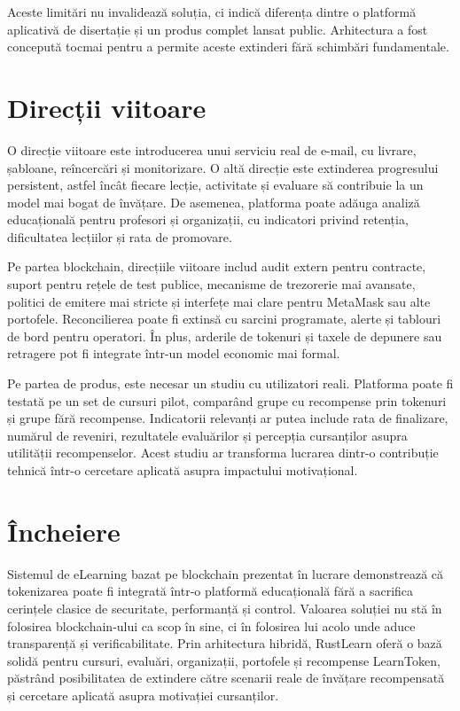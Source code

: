 Aceste limitări nu invalidează soluția, ci indică diferența dintre o platformă aplicativă de disertație și un produs complet lansat public. Arhitectura a fost concepută tocmai pentru a permite aceste extinderi fără schimbări fundamentale.

\section{Direcții viitoare}
O direcție viitoare este introducerea unui serviciu real de e-mail, cu livrare, șabloane, reîncercări și monitorizare. O altă direcție este extinderea progresului persistent, astfel încât fiecare lecție, activitate și evaluare să contribuie la un model mai bogat de învățare. De asemenea, platforma poate adăuga analiză educațională pentru profesori și organizații, cu indicatori privind retenția, dificultatea lecțiilor și rata de promovare.

Pe partea blockchain, direcțiile viitoare includ audit extern pentru contracte, suport pentru rețele de test publice, mecanisme de trezorerie mai avansate, politici de emitere mai stricte și interfețe mai clare pentru MetaMask sau alte portofele. Reconcilierea poate fi extinsă cu sarcini programate, alerte și tablouri de bord pentru operatori. În plus, arderile de tokenuri și taxele de depunere sau retragere pot fi integrate într-un model economic mai formal.

Pe partea de produs, este necesar un studiu cu utilizatori reali. Platforma poate fi testată pe un set de cursuri pilot, comparând grupe cu recompense prin tokenuri și grupe fără recompense. Indicatorii relevanți ar putea include rata de finalizare, numărul de reveniri, rezultatele evaluărilor și percepția cursanților asupra utilității recompenselor. Acest studiu ar transforma lucrarea dintr-o contribuție tehnică într-o cercetare aplicată asupra impactului motivațional.

\section{Încheiere}
Sistemul de eLearning bazat pe blockchain prezentat în lucrare demonstrează că tokenizarea poate fi integrată într-o platformă educațională fără a sacrifica cerințele clasice de securitate, performanță și control. Valoarea soluției nu stă în folosirea blockchain-ului ca scop în sine, ci în folosirea lui acolo unde aduce transparență și verificabilitate. Prin arhitectura hibridă, RustLearn oferă o bază solidă pentru cursuri, evaluări, organizații, portofele și recompense LearnToken, păstrând posibilitatea de extindere către scenarii reale de învățare recompensată și cercetare aplicată asupra motivației cursanților.
